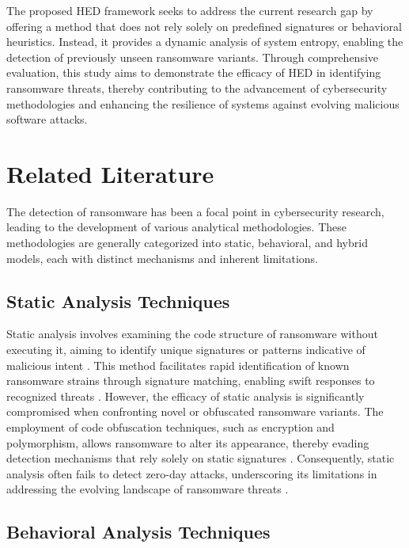 \documentclass[lettersize,journal]{IEEEtran}
\begin{document}
The proposed HED framework seeks to address the current research gap by offering a method that does not rely solely on predefined signatures or behavioral heuristics. Instead, it provides a dynamic analysis of system entropy, enabling the detection of previously unseen ransomware variants. Through comprehensive evaluation, this study aims to demonstrate the efficacy of HED in identifying ransomware threats, thereby contributing to the advancement of cybersecurity methodologies and enhancing the resilience of systems against evolving malicious software attacks.





\section{Related Literature}

The detection of ransomware has been a focal point in cybersecurity research, leading to the development of various analytical methodologies. These methodologies are generally categorized into static, behavioral, and hybrid models, each with distinct mechanisms and inherent limitations.

\subsection{Static Analysis Techniques}

Static analysis involves examining the code structure of ransomware without executing it, aiming to identify unique signatures or patterns indicative of malicious intent \cite{clarry2024dynamic}. This method facilitates rapid identification of known ransomware strains through signature matching, enabling swift responses to recognized threats \cite{yu2024ransomware}. However, the efficacy of static analysis is significantly compromised when confronting novel or obfuscated ransomware variants. The employment of code obfuscation techniques, such as encryption and polymorphism, allows ransomware to alter its appearance, thereby evading detection mechanisms that rely solely on static signatures \cite{zhang2024unveiling}. Consequently, static analysis often fails to detect zero-day attacks, underscoring its limitations in addressing the evolving landscape of ransomware threats \cite{hagerty2024ransomware}.

\subsection{Behavioral Analysis Techniques}
\end{document}
